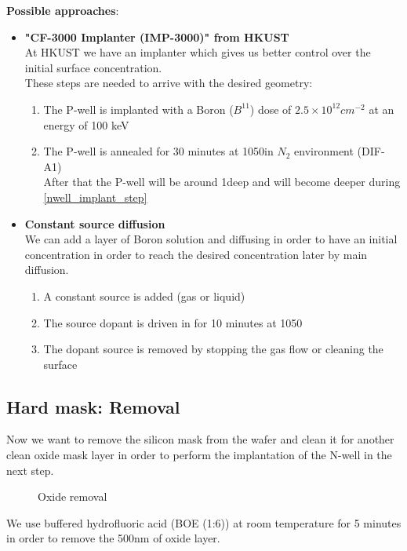 \textbf{Possible approaches}:
\begin{itemize}
	\item \textbf{"CF-3000 Implanter (IMP-3000)" from HKUST} \\
	At HKUST we have an implanter which gives us better control over the initial surface concentration. \\
	These steps are needed to arrive with the desired geometry:
	\begin{enumerate}
		\item The P-well is implanted with a Boron ($B^{11}$) dose of $2.5\times10^{12}cm^{-2}$ at an energy of 100 keV
		\item The P-well is annealed for 30 minutes at 1050\degreesC in $N_2$ environment (DIF-A1)\\
		After that the P-well will be around 1\um deep and will become deeper during \autoref{nwell_implant_step}
	\end{enumerate}
	\item \textbf{Constant source diffusion} \\
	We can add a layer of Boron solution and diffusing in order to have an initial concentration in order to reach the desired concentration later by main diffusion.
	\begin{enumerate}
		\item A constant source is added (gas or liquid)
		\item The source dopant is driven in for 10 minutes at 1050\degreesC
		\item The dopant source is removed by stopping the gas flow or cleaning the surface
	\end{enumerate}
\end{itemize}

\subsection{Hard mask: Removal}

Now we want to remove the silicon mask from the wafer and clean it for another clean oxide mask layer in order to perform the implantation of the N-well in the next step.

\begin{figure}[H]
	\centering
	\begin{tikzpicture}[node distance = 3cm, auto, thick,scale=\CrossSectionOnly, every node/.style={transform shape}]
		
	\end{tikzpicture}
	\drawStepArrow{}
	\begin{tikzpicture}[node distance = 3cm, auto, thick,scale=\CrossSectionOnly, every node/.style={transform shape}]
		
	\end{tikzpicture}
	\caption{Oxide removal}
\end{figure}

We use buffered hydrofluoric acid (BOE (1:6)) at room temperature for 5 minutes in order to remove the 500nm of oxide layer.
